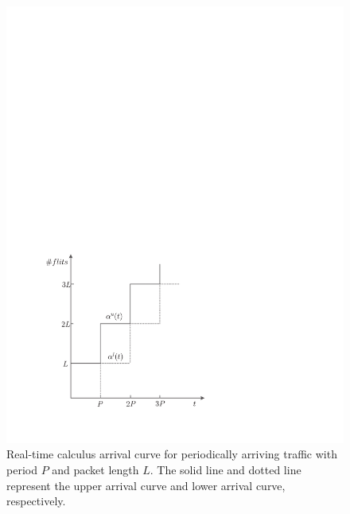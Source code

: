 \documentclass[10pt,journal]{IEEEtran}
\begin{document}
\begin{figure}
  \centering
  \includegraphics[scale=0.5]{figures/AC.pdf}
  \caption{Real-time calculus arrival curve for periodically arriving traffic with period $P$ and packet length $L$. The solid line and dotted line represent the upper arrival curve and lower arrival curve, respectively.}\label{ac}
\end{figure}
\end{document}
